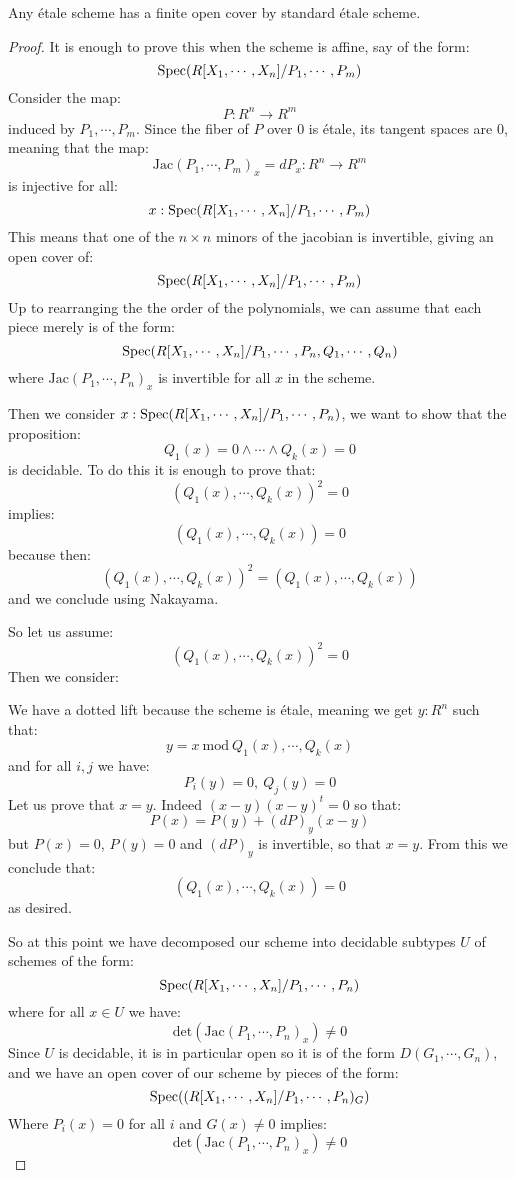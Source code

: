 \begin{proposition}
Any étale scheme has a finite open cover by standard étale scheme.
\end{proposition}

\begin{proof}
It is enough to prove this when the scheme is affine, say of the form:
\[\operatorname{Spec}(R[X_1,\cdots,X_n]/P_1,\cdots,P_m)\]
Consider the map:
\[P:R^n\to R^m\]
induced by $P_1,\cdots,P_m$. Since the fiber of $P$ over $0$ is étale, its tangent spaces are $0$, meaning that the map:
\[\mathrm{Jac}(P_1,\cdots,P_m)_x = dP_x : R^n\to R^m\]
is injective for all: 
\[x:\operatorname{Spec}(R[X_1,\cdots,X_n]/P_1,\cdots,P_m)\]
This means that one of the $n\times n$ minors of the jacobian is invertible, giving an open cover of:
\[\operatorname{Spec}(R[X_1,\cdots,X_n]/P_1,\cdots,P_m)\] 
Up to rearranging the the order of the polynomials, we can assume that each piece merely is of the form:
\[\operatorname{Spec}(R[X_1,\cdots,X_n]/P_1,\cdots,P_n,Q_1,\cdots,Q_n)\]
where $\mathrm{Jac}(P_1,\cdots,P_n)_x$ is invertible for all $x$ in the scheme.

Then we consider $x:\operatorname{Spec}(R[X_1,\cdots,X_n]/P_1,\cdots,P_n)$, we want to show that the proposition:
\[Q_1(x)=0\land \cdots\land Q_k(x)=0\]
is decidable. To do this it is enough to prove that: 
\[(Q_1(x),\cdots,Q_k(x))^2 = 0\] 
implies: 
\[(Q_1(x),\cdots,Q_k(x))=0\] 
because then:
\[(Q_1(x),\cdots,Q_k(x))^2 = (Q_1(x),\cdots,Q_k(x))\]
and we conclude using Nakayama. 

So let us assume: 
\[(Q_1(x),\cdots,Q_k(x))^2=0\]
Then we consider:
  \begin{center}
    \end{center}
    We have a dotted lift because the scheme is étale, meaning we get $y:R^n$ such that:
    \[y = x\ \mathrm{mod}\ Q_1(x),\cdots,Q_k(x)\]
    and for all $i,j$ we have:
    \[P_i(y) = 0,\ Q_j(y)=0\]
    Let us prove that $x=y$. Indeed $(x-y)(x-y)^t=0$ so that:
    \[P(x) = P(y) + (dP)_y (x-y)\]
    but $P(x)=0$, $P(y)=0$ and $(dP)_y$ is invertible, so that $x=y$. From this we conclude that:
    \[(Q_1(x),\cdots,Q_k(x)) = 0\]
    as desired.
    
    So at this point we have decomposed our scheme into decidable subtypes $U$ of schemes of the form:
    \[\operatorname{Spec}(R[X_1,\cdots,X_n]/P_1,\cdots,P_n)\]
    where for all $x\in U$ we have:
    \[\mathrm{det}(\mathrm{Jac}(P_1,\cdots,P_n)_x)\not=0\] 
    Since $U$ is decidable, it is in particular open so it is of the form $D(G_1,\cdots,G_n)$, and we have an open cover of our scheme by pieces of the form:
    \[\operatorname{Spec}((R[X_1,\cdots,X_n]/P_1,\cdots,P_n)_G)\]
    Where $P_i(x)=0$ for all $i$ and $G(x)\not=0$ implies:
    \[\mathrm{det}(\mathrm{Jac}(P_1,\cdots,P_n)_x)\not=0\]
    

\end{proof}
